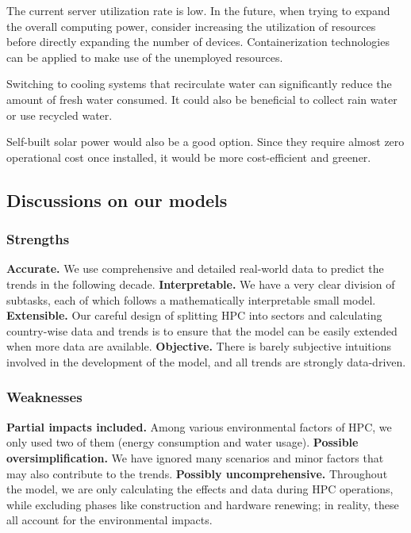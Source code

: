 \documentclass[12pt]{article}
\begin{document}
The current server utilization rate is low. In the future, when trying to expand the overall computing power, consider increasing the utilization of resources before directly expanding the number of devices. Containerization technologies can be applied to make use of the unemployed resources.

Switching to cooling systems that recirculate water can significantly reduce the amount of fresh water consumed. It could also be beneficial to collect rain water or use recycled water.

Self-built solar power would also be a good option. Since they require almost zero operational cost once installed, it would be more cost-efficient and greener.

\subsection{Discussions on our models}

\subsubsection{Strengths}

\textbf{Accurate.} We use comprehensive and detailed real-world data to predict the trends in the following decade. \textbf{Interpretable.} We have a very clear division of subtasks, each of which follows a mathematically interpretable small model. \textbf{Extensible.} Our careful design of splitting HPC into sectors and calculating country-wise data and trends is to ensure that the model can be easily extended when more data are available. \textbf{Objective.} There is barely subjective intuitions involved in the development of the model, and all trends are strongly data-driven.

\subsubsection{Weaknesses}

\textbf{Partial impacts included.} Among various environmental factors of HPC, we only used two of them (energy consumption and water usage). \textbf{Possible oversimplification.} We have ignored many scenarios and minor factors that may also contribute to the trends. \textbf{Possibly uncomprehensive.} Throughout the model, we are only calculating the effects and data during HPC operations, while excluding phases like construction and hardware renewing; in reality, these all account for the environmental impacts.
\end{document}
